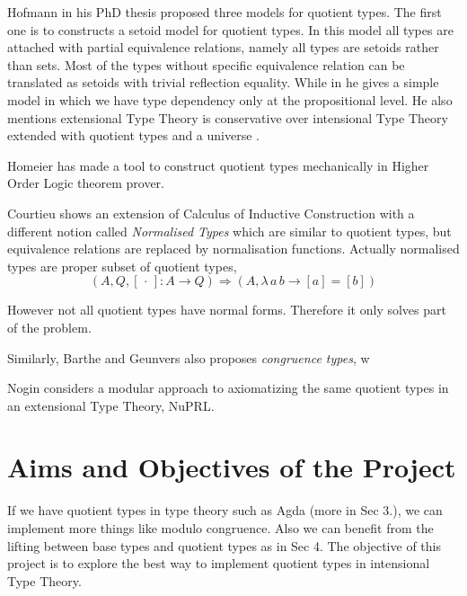 \documentclass[envcountsame]{llncs}
\newcommand{\dotph}{\,\cdot\,}
\providecommand{\class}[1]{[#1]}
\newcommand{\itt}{intensional Type Theory}
\begin{document}
Hofmann in his PhD thesis \cite{hof:phd} proposed three models for quotient types. The first one is to constructs a setoid model for quotient types. In this model all types are attached with partial equivalence relations, namely all types are setoids rather than sets. Most of the types without specific equivalence relation can be translated as setoids with trivial reflection equality. While in \cite{hof:95:sm} he gives a simple model in which we have type dependency only at the propositional level.
He also mentions extensional Type Theory is conservative over \itt {}  extended with quotient types and a universe \cite{hof:95:con}.

Homeier \cite{hom} has made a tool to construct quotient types mechanically in Higher Order Logic theorem prover.

Courtieu \cite{cou:01} shows an extension of Calculus of Inductive Construction
with a different notion called \emph{Normalised Types} which are similar to quotient types, but equivalence relations are replaced by normalisation functions. Actually normalised types are proper subset of quotient types,
\[ (A, Q, \class\dotph \colon A \to Q) \Rightarrow(A, \lambda \,a \,b\to \class a = \class b)\]

However not all quotient types have normal forms. Therefore it only solves part of the problem.

Similarly, Barthe and Geunvers \cite{bar:96} also proposes \emph{congruence types}, w

Nogin \cite{nog:02} considers a modular approach to axiomatizing the same quotient types in an extensional Type Theory, NuPRL. 
 
\section{Aims and Objectives of the Project}

If we have quotient types in type theory such as Agda (more in Sec 3.), we can implement more things like modulo congruence. Also we can benefit from the lifting between base types and quotient types as in Sec 4.  The objective of this project is to explore the best way to implement quotient types in intensional Type Theory.

% 
\end{document}
